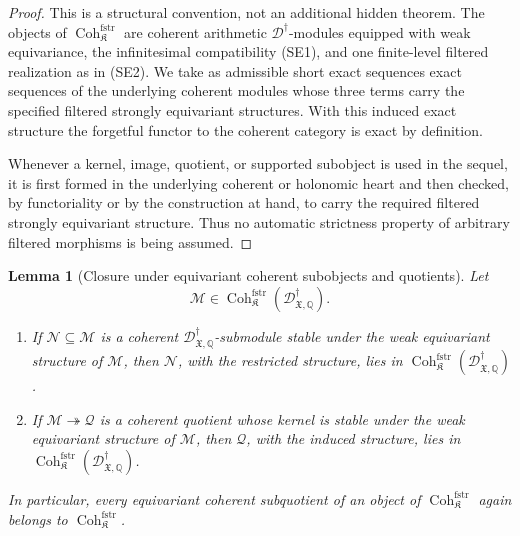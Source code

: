 \documentclass[11pt]{amsart}
\theoremstyle{plain}
\newtheorem{lemma}{Lemma}[section]
\theoremstyle{definition}
\theoremstyle{remark}
\newcommand{\Coh}{\operatorname{Coh}}
\newcommand{\fstr}{\mathrm{fstr}}
\begin{document}
\begin{proof}
This is a structural convention, not an additional hidden theorem.  The objects
of \(\Coh^{\fstr}_{\mathfrak K}\) are coherent arithmetic
\(\mathscr D^\dagger\)-modules equipped with weak equivariance, the
infinitesimal compatibility \textup{(SE1)}, and one finite-level filtered
realization as in \textup{(SE2)}.  We take as admissible short exact sequences
exact sequences of the underlying coherent modules whose three terms carry the
specified filtered strongly equivariant structures.  With this induced exact
structure the forgetful functor to the coherent category is exact by
definition.

Whenever a kernel, image, quotient, or supported subobject is used in the
sequel, it is first formed in the underlying coherent or holonomic heart and
then checked, by functoriality or by the construction at hand, to carry the
required filtered strongly equivariant structure.  Thus no automatic
strictness property of arbitrary filtered morphisms is being assumed.
\end{proof}


\begin{lemma}[Closure under equivariant coherent subobjects and quotients]
\label{lem:fstr-subquotient-closure}
Let
\[
  \mathcal M\in
  \Coh^{\fstr}_{\mathfrak K}
  (\mathscr D^\dagger_{\mathfrak X,\mathbb Q}).
\]
\begin{enumerate}[label=\textup{(\roman*)}]
\item If \(\mathcal N\subseteq\mathcal M\) is a coherent
\(\mathscr D^\dagger_{\mathfrak X,\mathbb Q}\)-submodule stable under the weak
equivariant structure of \(\mathcal M\), then \(\mathcal N\), with the
restricted structure, lies in
\(\Coh^{\fstr}_{\mathfrak K}(\mathscr D^\dagger_{\mathfrak X,\mathbb Q})\).
\item If \(\mathcal M\twoheadrightarrow\mathcal Q\) is a coherent quotient whose
kernel is stable under the weak equivariant structure of \(\mathcal M\), then
\(\mathcal Q\), with the induced structure, lies in
\(\Coh^{\fstr}_{\mathfrak K}(\mathscr D^\dagger_{\mathfrak X,\mathbb Q})\).
\end{enumerate}
In particular, every equivariant coherent subquotient of an object of
\(\Coh^{\fstr}_{\mathfrak K}\) again belongs to
\(\Coh^{\fstr}_{\mathfrak K}\).
\end{lemma}
\end{document}
